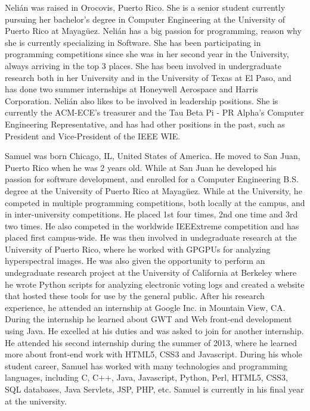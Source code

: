 \label{sec:bios}


Nelián was raised in Orocovis, Puerto Rico. She is a senior
student currently pursuing her bachelor's degree in Computer Engineering at the
University of Puerto Rico at Mayagüez. Nelián has a big passion for programming,
reason why she is currently specializing in Software. She
has been participating in programming competitions since she was in her second
year in the University, always arriving in the top 3 places. She has been involved in
undergraduate research both in her University and in the University of Texas at
El Paso,  and has done two summer internships at
Honeywell Aerospace and Harris Corporation. Nelián also likes to be
involved in leadership positions.  She is currently the ACM-ECE's treasurer and
the Tau Beta Pi - PR Alpha's Computer Engineering Representative, and has had
other positions in the past, such as President and Vice-President of the IEEE
WIE.


Samuel was born Chicago, IL, United States of America. He
moved to San Juan, Puerto Rico when he was 2 years old. While at San Juan he
developed his passion for software development, and enrolled for a Computer
Engineering B.S. degree at the University of Puerto Rico at Mayagüez. While at
the University, he competed in multiple programming competitions, both locally
at the campus, and in inter-university competitions. He placed 1st four times,
2nd one time and 3rd two times. He also competed in the worldwide IEEExtreme
competition and has placed first campus-wide. He was then involved in
undegraduate research at the University of Puerto Rico, where he worked with
GPGPUs for analyzing hyperspectral images. He was also given the opportunity to
perform an undegraduate research project at the University of California at
Berkeley where he wrote Python scripts for analyzing electronic voting logs and
created a website that hosted these tools for use by the general public. After
his research experience, he attended an internship at Google Inc. in Mountain
View, CA. During the internship he learned about GWT and Web front-end
development using Java. He excelled at his duties and was asked to join for
another internship. He attended his second internship during the summer of 2013,
where he learned more about front-end work with HTML5, CSS3 and Javascript.
During his whole student career, Samuel has worked with many technologies and
programming languages, including C, C++, Java, Javascript, Python, Perl, HTML5,
CSS3, SQL databases, Java Servlets, JSP, PHP, etc. Samuel is currently in his
final year at the university.

